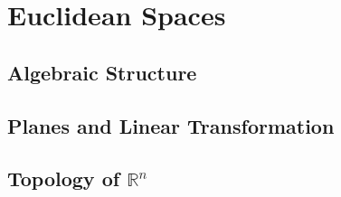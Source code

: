 \documentclass{report}
\begin{document}

\setcounter{chapter}{7}
\chapter{Euclidean Spaces}
\thispagestyle{empty}
\newpage

\section{Algebraic Structure}

\setcounter{Exercise}{1}


\vspace{12pt}

\setcounter{Exercise}{8}



\section{Planes and Linear Transformation}

\setcounter{Exercise}{3}


\vspace{12pt}

\setcounter{Exercise}{10}



\section{Topology of $\mathbb{R}^n$}

\setcounter{Exercise}{3}


\vspace{12pt}

\setcounter{Exercise}{5}

\end{document}
